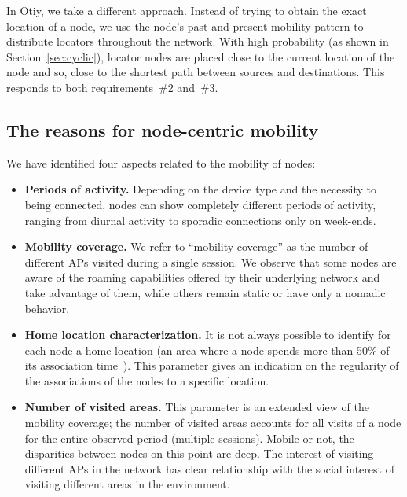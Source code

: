 \documentclass[a4paper]{sig-alternate-10pt}
\newcommand{\otiy}{{\sffamily Otiy}}
\begin{document}
In \otiy, we take a different approach. Instead of trying to obtain
the exact location of a node, we use the node's past and present
mobility pattern to distribute locators throughout the network. With
high probability (as shown in Section~\ref{sec:cyclic}), locator
nodes are placed close to the current location of the node and so,
close to the shortest path between sources and destinations. This
responds to both requirements~\#2 and~\#3.


\subsection{The reasons for node-centric mobility}
\label{subsec:nodecentric}

We have identified four aspects related to the mobility of nodes:

\begin{itemize}

\item \textbf{Periods of activity.} Depending on the device type and
the necessity to being connected, nodes can show completely different 
periods of activity, ranging from diurnal activity to sporadic connections 
only on week-ends.

\item \textbf{Mobility coverage.} We refer to ``mobility
coverage'' as the number of different APs visited during a single
session. We observe that some nodes are aware of the roaming
capabilities offered by their underlying network and take advantage
of them, while others remain static or have only a nomadic behavior.

\item \textbf{Home location characterization.} It is not always
possible to identify for each node a home location (an area where a
node spends more than 50\% of its association
time~\cite{henders_usage}). This parameter gives an indication on
the regularity of the associations of the nodes to a specific
location.

\item \textbf{Number of visited areas.} This parameter is
an extended view of the mobility coverage; the number of visited
areas accounts for all visits of a node for the entire observed
period (multiple sessions). Mobile or not, the disparities between
nodes on this point are deep. The interest of visiting different APs
in the network has clear relationship with the social interest of
visiting different areas in the environment.

\end{itemize}
\end{document}
